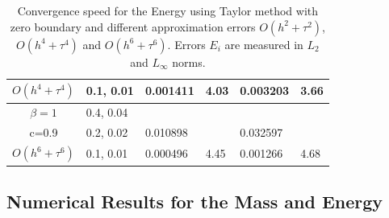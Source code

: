 \documentclass[%
 aip,
cp,  %
 amsmath,amssymb,%
 reprint,%
]{revtex4-2}
\begin{document}
\begin{table}[ht]
\begin{tabular}{||c|l|ll|ll||}
       $O(h^4+ \tau^4)$ &0.1, 0.01   &0.001411 & 4.03   & 0.003203  & 3.66  \\
    \hline
  $\beta=1$     &0.4, 0.04   &            &          &                  &      \\
      c=0.9                    &0.2, 0.02   &0.010898 &           & 0.032597      &       \\
     $O(h^6+ \tau^6)$ &0.1, 0.01 & 0.000496 &4.45 & 0.001266  & 4.68        \\
	   \hline
			\hline 
		\end{tabular}
		\caption{Convergence speed for the Energy using Taylor method with zero boundary and different approximation errors $O(h^{2} + \tau^2 )$, $O(h^{4} + \tau^4 )$ and $O(h^{6} + \tau^6 )$. Errors $E_i$ are measured in $L_2$ and $L_\infty$ norms.}
\label{tableB}
\end{table}

\subsection{Numerical Results for the Mass and Energy}
\end{document}
